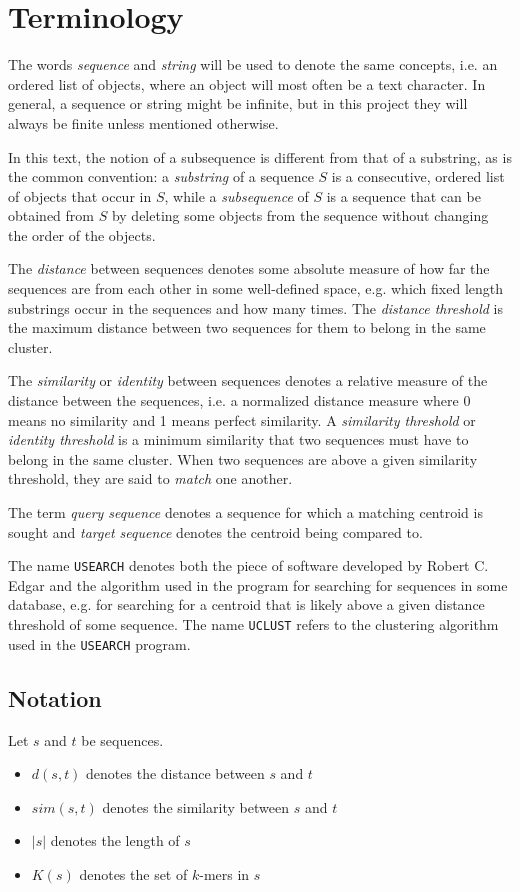 \section{Terminology}

The words \emph{sequence} and \emph{string} will be used to denote the same
concepts, i.e. an ordered list of objects, where an object will most often be a
text character. In general, a sequence or string might be infinite, but in this
project they will always be finite unless mentioned otherwise.

In this text, the notion of a subsequence is different from that of a
substring, as is the common convention: a \emph{substring} of a sequence $S$ is
a consecutive, ordered list of objects that occur in $S$, while a
\emph{subsequence} of $S$ is a sequence that can be obtained from $S$ by
deleting some objects from the sequence without changing the order of the
objects.

The \emph{distance} between sequences denotes some absolute measure of how far
the sequences are from each other in some well-defined space, e.g. which fixed
length substrings occur in the sequences and how many times. The
\emph{distance threshold} is the maximum distance between two sequences for
them to belong in the same cluster.

The \emph{similarity} or \emph{identity} between sequences denotes a relative
measure of the distance between the sequences, i.e. a normalized distance
measure where \num{0} means no similarity and \num{1} means perfect similarity. A
\emph{similarity threshold} or \emph{identity threshold} is a minimum
similarity that two sequences must have to belong in the same cluster.  When
two sequences are above a given similarity threshold, they are said to
\emph{match} one another.

The term \emph{query sequence} denotes a sequence for which a matching centroid
is sought and \emph{target sequence} denotes the centroid being compared to.

The name \texttt{USEARCH} denotes both the piece of software developed by
Robert C. Edgar and the algorithm used in the program for searching for
sequences in some database, e.g. for searching for a centroid that is likely
above a given distance threshold of some sequence. The name \texttt{UCLUST}
refers to the clustering algorithm used in the \texttt{USEARCH} program.


\subsection{Notation}

Let $s$ and $t$ be sequences.
\begin{itemize}
  \item $d(s,t)$ denotes the distance between $s$ and $t$
  \item $sim(s,t)$ denotes the similarity between $s$ and $t$
  \item $|s|$ denotes the length of $s$
  \item $K(s)$ denotes the set of $k$-mers in $s$
\end{itemize}
